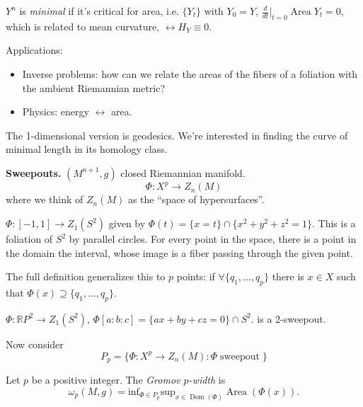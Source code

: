 \begin{definition}
\label{definition-minimal-hypersurface}
$Y^n$ is {\it minimal} if it's critical
for area, i.e. $\{Y_t\}$ with $Y_0=Y$,
$\frac{d}{dt}\Big|_{t=0}\operatorname{Area}
Y_t=0$, which is related to mean curvature,
$\leftrightarrow H_Y \equiv0$.
\end{definition}

\noindent
Applications:

\begin{itemize}
\item Inverse problems: how can we
relate the areas of the fibers of a
foliation with the ambient Riemannian
metric?

\item Physics: energy $\leftrightarrow$ area.
\end{itemize}

\noindent
The 1-dimensional version is geodesics.
We're interested in finding the curve
of minimal length in its homology class.

\medskip\noindent
{\bf Sweepouts.}
 $(M^{n+1},g)$ closed Riemannian manifold.
$$
\Phi:X^p \to Z_n(M)
$$
where we think of $Z_n(M)$ as the 
``space of hypersurfaces''.

\begin{example}
\label{example-1-sweepout}
$\Phi:[-1,1] \to Z_1(S^2)$ given by
$\Phi(t) = \{x = t\} \cap\{x^2+y^2+z^2=1\}$.
This is a foliation of $S^2$ by parallel
circles. For every point in the space,
there is a point in the domain
the interval, whose image is a fiber passing
through the given point.
\end{example}

\noindent
The full definition generalizes this
to $p$ points: if $\forall \{q_1,…,q_p\}$
there is $x \in X$ such that $\Phi(x)
\supseteq \{q_1,…,q_p\}$.

\begin{example}
\label{example-rp2-sweepout}
$\Phi:\mathbb{R}P^2 \to Z_1(S^2)$,
$\Phi[a:b:c] = \{ax+by+cz=0\}\cap S^2$.
is a 2-sweepout.
\end{example}

\noindent
Now consider
$$
P_p = \{\Phi:X^p \to Z_n(M):
\Phi \operatorname{sweepout}\}
$$
\begin{definition}
\label{definition-gromov-p-width}
Let $p$ be a positive integer.
The {\it Gromov $p$-width} is
$$
\omega_p(M,g) = \text{inf}_{\Phi \in P_p}
\text{sup}_{x \in \operatorname{Dom}(\Phi)}
\operatorname{Area}(\Phi(x)).
$$
\end{definition}

